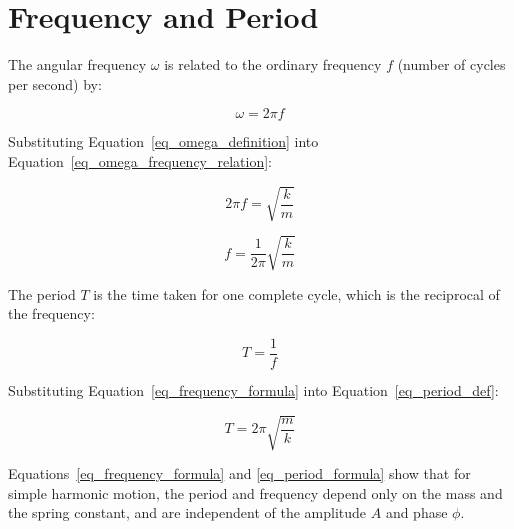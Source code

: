 \documentclass{article}
\begin{document}
\section{Frequency and Period}

The angular frequency $\omega$ is related to the ordinary frequency $f$ (number of cycles per second) by:

\begin{equation}
\omega = 2 \pi f
\label{eq_omega_frequency_relation}
\end{equation}

Substituting Equation~\ref{eq_omega_definition} into Equation~\ref{eq_omega_frequency_relation}:

\begin{equation}
2 \pi f = \sqrt{\frac{k}{m}}
\label{eq_freq_derivation_step}
\end{equation}

\begin{equation}
f = \frac{1}{2 \pi} \sqrt{\frac{k}{m}}
\label{eq_frequency_formula}
\end{equation}

The period $T$ is the time taken for one complete cycle, which is the reciprocal of the frequency:

\begin{equation}
T = \frac{1}{f}
\label{eq_period_def}
\end{equation}

Substituting Equation~\ref{eq_frequency_formula} into Equation~\ref{eq_period_def}:

\begin{equation}
T = 2 \pi \sqrt{\frac{m}{k}}
\label{eq_period_formula}
\end{equation}

Equations~\ref{eq_frequency_formula} and \ref{eq_period_formula} show that for simple harmonic motion, the period and frequency depend only on the mass and the spring constant, and are independent of the amplitude $A$ and phase $\phi$.
\end{document}
